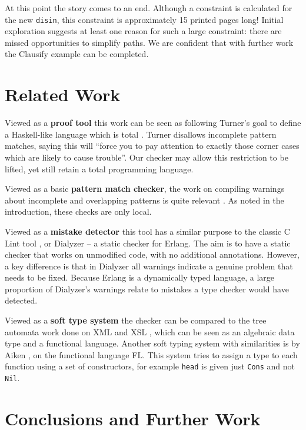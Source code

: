\documentclass[book]{tfp05symp}
\newcommand{\T}[1]{\texttt{#1}}
\begin{document}
At this point the story comes to an end. Although a constraint is
calculated for the new \T{disin}, this constraint is approximately
15 printed pages long! Initial exploration suggests at least one
reason for such a large constraint: there are missed opportunities
to simplify paths. We are confident that with further work the
Clausify example can be completed.

\section{Related Work}
\label{sec:related_work}

Viewed as a \textbf{proof tool} this work can be seen as following
Turner's goal to define a Haskell-like language which is total
\cite{tfp:total}. Turner disallows incomplete pattern matches,
saying this will ``force you to pay attention to exactly those
corner cases which are likely to cause trouble''. Our checker may
allow this restriction to be lifted, yet still retain a total
programming language.

Viewed as a basic \textbf{pattern match checker}, the work on
compiling warnings about incomplete and overlapping patterns is
quite relevant \cite{ghc,pattern_match}. As noted in the
introduction, these checks are only local.

Viewed as a \textbf{mistake detector} this tool has a similar
purpose to the classic C Lint tool \cite{lint}, or Dialyzer
\cite{dialyzer} -- a static checker for Erlang. The aim is to have a
static checker that works on unmodified code, with no additional
annotations. However, a key difference is that in Dialyzer all
warnings indicate a genuine problem that needs to be fixed. Because
Erlang is a dynamically typed language, a large proportion of
Dialyzer's warnings relate to mistakes a type checker would have
detected.

Viewed as a \textbf{soft type system} the checker can be compared to
the tree automata work done on XML and XSL \cite{static_xslt}, which
can be seen as an algebraic data type and a functional language.
Another soft typing system with similarities is by Aiken
\cite{type:dynamic}, on the functional language FL. This system
tries to assign a type to each function using a set of constructors,
for example \T{head} is given just \T{Cons} and not \T{Nil}.

\section{Conclusions and Further Work}
\label{sec:conclusions}
\end{document}

